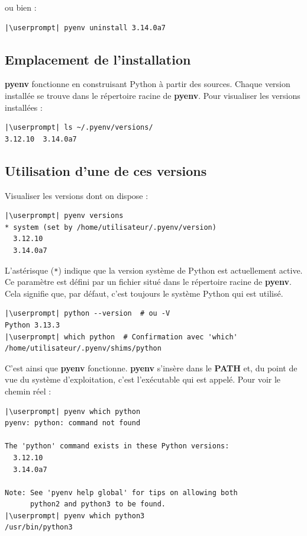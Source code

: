 ou bien :
\begin{lstlisting}[style=bash]
|\userprompt| pyenv uninstall 3.14.0a7
\end{lstlisting}

\subsection*{Emplacement de l'installation}
\textbf{pyenv} fonctionne en construisant Python à partir des sources. Chaque version installée se trouve dans le répertoire racine de \textbf{pyenv}. Pour visualiser les versions installées :
\begin{lstlisting}[style=bash]
|\userprompt| ls ~/.pyenv/versions/
3.12.10  3.14.0a7
\end{lstlisting}

\subsection*{Utilisation d'une de ces versions}
Visualiser les versions dont on dispose :
\begin{lstlisting}[style=bash]
|\userprompt| pyenv versions
* system (set by /home/utilisateur/.pyenv/version)
  3.12.10
  3.14.0a7
\end{lstlisting}

L'astérisque (\texttt{*}) indique que la version système de Python est actuellement active. Ce paramètre est défini par un fichier situé dans le répertoire racine de \textbf{pyenv}. Cela signifie que, par défaut, c'est toujours le système Python qui est utilisé.
\begin{lstlisting}[style=bash]
|\userprompt| python --version  # ou -V
Python 3.13.3
|\userprompt| which python  # Confirmation avec 'which'
/home/utilisateur/.pyenv/shims/python
\end{lstlisting}

C'est ainsi que \textbf{pyenv} fonctionne. \textbf{pyenv} s'insère dans le \textbf{PATH} et, du point de vue du système d'exploitation, c'est l'exécutable qui est appelé. Pour voir le chemin réel :
\begin{lstlisting}[style=bash]
|\userprompt| pyenv which python
pyenv: python: command not found

The 'python' command exists in these Python versions:
  3.12.10
  3.14.0a7

Note: See 'pyenv help global' for tips on allowing both
      python2 and python3 to be found.
|\userprompt| pyenv which python3
/usr/bin/python3
\end{lstlisting}

